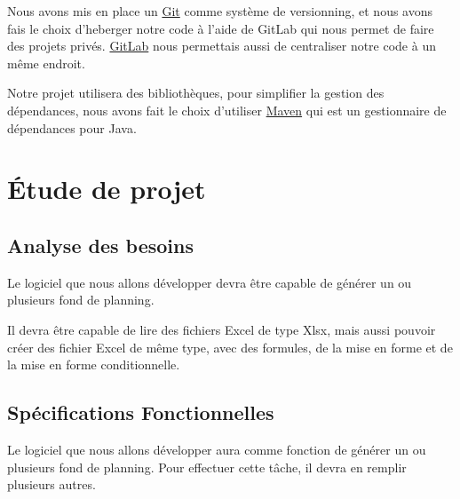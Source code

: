 \documentclass{polytech/polytech}
\begin{document}
	Nous avons mis en place un \href{https://git-scm.com/}{Git} comme système de versionning, et nous avons fais le choix d'heberger notre code à l'aide de GitLab qui nous permet de faire des projets privés.
	\href{https://about.gitlab.com/}{GitLab} nous permettais aussi de centraliser notre code à un même endroit.

	Notre projet utilisera des bibliothèques, pour simplifier la gestion des dépendances, nous avons fait le choix d'utiliser \href{https://maven.apache.org/}{Maven} qui est un gestionnaire de dépendances pour Java.

	\chapter{Étude de projet}
	\section{Analyse des besoins}

	Le logiciel que nous allons développer devra être capable de générer un ou plusieurs fond de planning.

	Il devra être capable de lire des fichiers Excel de type Xlsx,
	mais aussi pouvoir créer des fichier Excel de même type, avec des formules, de la mise en forme et de la mise en forme conditionnelle.

	\section{Spécifications Fonctionnelles}

	Le logiciel que nous allons développer aura comme fonction de générer un ou plusieurs fond de planning. Pour effectuer cette tâche, il devra en remplir plusieurs autres.
\end{document}
